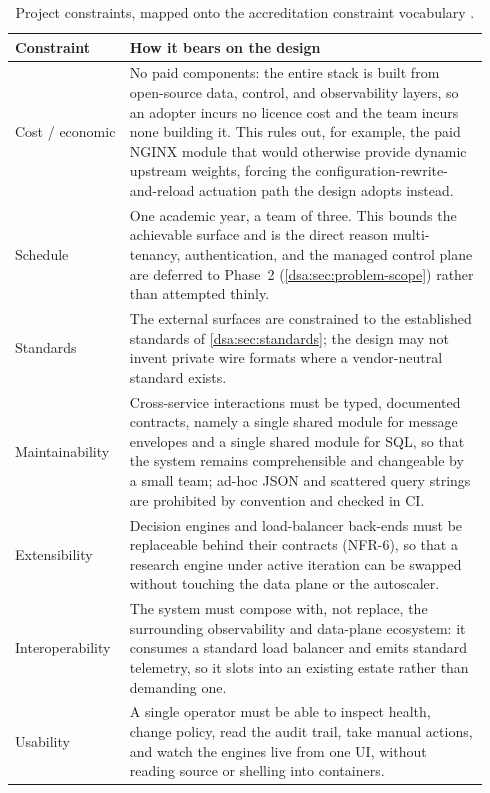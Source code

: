 \begin{table}[H]
\centering
\caption[Project constraints by accreditation category]{Project constraints, mapped onto the accreditation constraint vocabulary \cite{abet2025criteria}.}
\label{dsa:tab:constraints}
\small
\begin{tabular}{@{}p{0.22\linewidth}p{0.72\linewidth}@{}}
\toprule
\textbf{Constraint} & \textbf{How it bears on the design} \\
\midrule
Cost / economic & No paid components: the entire stack is built from open-source data,
control, and observability layers, so an adopter incurs no licence cost and the team
incurs none building it. This rules out, for example, the paid NGINX module that would
otherwise provide dynamic upstream weights, forcing the configuration-rewrite-and-reload
actuation path the design adopts instead. \\
Schedule & One academic year, a team of three. This bounds the achievable surface and
is the direct reason multi-tenancy, authentication, and the managed control plane are
deferred to Phase~2 (\cref{dsa:sec:problem-scope}) rather than attempted thinly. \\
Standards & The external surfaces are constrained to the established standards of
\cref{dsa:sec:standards}; the design may not invent private wire formats where a
vendor-neutral standard exists. \\
Maintainability & Cross-service interactions must be typed, documented contracts,
namely a single shared module for message envelopes and a single shared module for SQL,
so that the system remains comprehensible and changeable by a small team; ad-hoc JSON and
scattered query strings are prohibited by convention and checked in CI. \\
Extensibility & Decision engines and load-balancer back-ends must be replaceable behind
their contracts (NFR-6), so that a research engine under active iteration can be swapped
without touching the data plane or the autoscaler. \\
Interoperability & The system must compose with, not replace, the surrounding
observability and data-plane ecosystem: it consumes a standard load balancer and emits
standard telemetry, so it slots into an existing estate rather than demanding one. \\
Usability & A single operator must be able to inspect health, change policy, read the
audit trail, take manual actions, and watch the engines live from one UI, without
reading source or shelling into containers. \\

\end{tabular}
\end{table}
